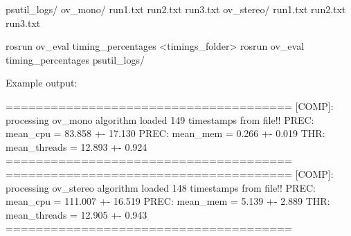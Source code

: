 \begin{DoxyCode}
psutil\_logs/
    ov\_mono/
        run1.txt
        run2.txt
        run3.txt
    ov\_stereo/
        run1.txt
        run2.txt
        run3.txt
\end{DoxyCode}



\begin{DoxyCode}
rosrun ov\_eval timing\_percentages <timings\_folder>
rosrun ov\_eval timing\_percentages psutil\_logs/
\end{DoxyCode}


Example output\+:


\begin{DoxyCode}
======================================
[COMP]: processing ov\_mono algorithm
    loaded 149 timestamps from file!!
    PREC: mean\_cpu = 83.858 +- 17.130
    PREC: mean\_mem = 0.266 +- 0.019
    THR: mean\_threads = 12.893 +- 0.924
======================================
======================================
[COMP]: processing ov\_stereo algorithm
    loaded 148 timestamps from file!!
    PREC: mean\_cpu = 111.007 +- 16.519
    PREC: mean\_mem = 5.139 +- 2.889
    THR: mean\_threads = 12.905 +- 0.943
======================================
\end{DoxyCode}


 